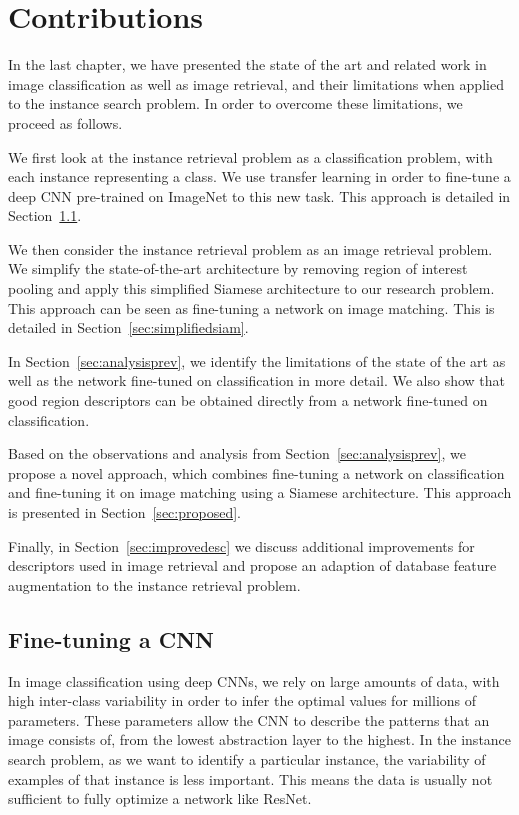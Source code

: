 

\chapter{Contributions}
In the last chapter, we have presented the state of the art and related work in
image classification as well as image retrieval, and their limitations when
applied to the instance search problem.
In order to overcome these limitations, we proceed as follows.

We first look at the instance retrieval problem as a
classification problem, with each instance representing a class.
We use transfer learning in order to fine-tune
a deep CNN pre-trained on ImageNet to this new task. This approach
is detailed in Section~\ref{sec:finetuning}.

We then consider the instance retrieval problem as an image retrieval
problem. We simplify the state-of-the-art architecture by removing
region of interest pooling and apply this simplified Siamese architecture
to our research problem. This approach can be seen as fine-tuning a network
on image matching. This is detailed in Section~\ref{sec:simplifiedsiam}.

In Section~\ref{sec:analysisprev}, we identify the limitations of the
state of the art as well as the network fine-tuned on classification
in more detail. We also show that good region descriptors can be obtained
directly from a network fine-tuned on classification.

Based on the observations and analysis from Section~\ref{sec:analysisprev},
we propose a novel approach, which combines fine-tuning a network on
classification and fine-tuning it on image matching using a Siamese
architecture. This approach is presented in Section~\ref{sec:proposed}.

Finally, in Section~\ref{sec:improvedesc} we discuss additional
improvements for descriptors used in image retrieval and propose
an adaption of database feature augmentation to the instance retrieval problem.

\section{Fine-tuning a CNN}\label{sec:finetuning}
In image classification using deep CNNs, we rely on large amounts of data, with high inter-class variability in order to infer the optimal values for
millions of parameters. These parameters allow the CNN to describe the
patterns that an image consists of, from the lowest abstraction layer to
the highest. In the instance search problem, as we want to identify a particular instance, the variability of examples of that instance is less important. This means the data is usually not sufficient to fully optimize a network like ResNet.


